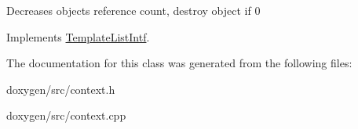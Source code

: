 Decreases object\textquotesingle{}s reference count, destroy object if 0 

Implements \mbox{\hyperlink{class_template_list_intf_a0c53169c740c09dac47efc62bbe39674}{Template\+List\+Intf}}.



The documentation for this class was generated from the following files\+:\begin{DoxyCompactItemize}
\item 
doxygen/src/context.\+h\item 
doxygen/src/context.\+cpp\end{DoxyCompactItemize}
